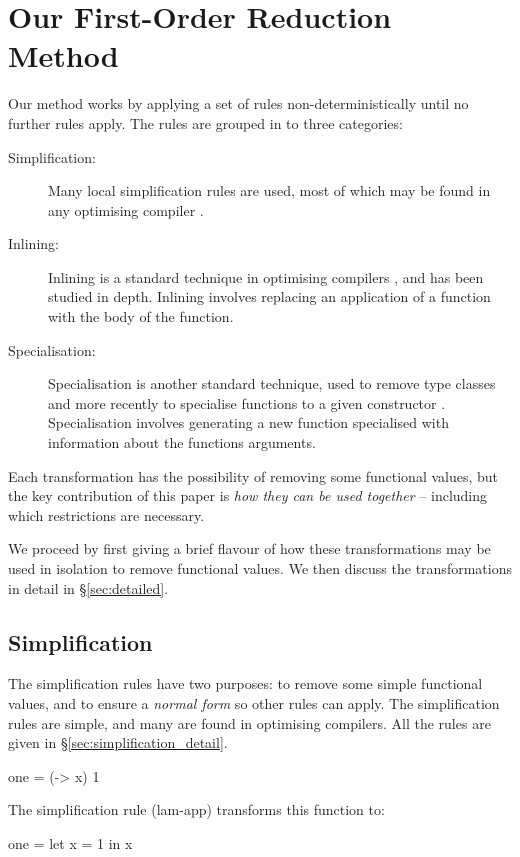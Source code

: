 \documentclass[preprint]{sigplanconf}
\begin{document}
\section{Our First-Order Reduction Method}
\label{sec:overview}

Our method works by applying a set of rules non-deterministically until no further rules apply. The rules are grouped in to three categories:

\begin{description}
\item[Simplification:] Many local simplification rules are used, most of which may be found in any optimising compiler \cite{spj:transformation}.
\item[Inlining:] Inlining is a standard technique in optimising compilers \cite{spj:inlining}, and has been studied in depth. Inlining involves replacing an application of a function with the body of the function.
\item[Specialisation:] Specialisation is another standard technique, used to remove type classes \cite{jones:dictionary_free} and more recently to specialise functions to a given constructor \cite{spj:specconstr}. Specialisation involves generating a new function specialised with information about the functions arguments.
\end{description}

Each transformation has the possibility of removing some functional values, but the key contribution of this paper is \textit{how they can be used together} -- including which restrictions are necessary.

We proceed by first giving a brief flavour of how these transformations may be used in isolation to remove functional values. We then discuss the transformations in detail in \S\ref{sec:detailed}.

\subsection{Simplification}

The simplification rules have two purposes: to remove some simple functional values, and to ensure a \textit{normal form} so other rules can apply. The simplification rules are simple, and many are found in optimising compilers. All the rules are given in \S\ref{sec:simplification_detail}.

\begin{example}
\begin{code}
one = (\x -> x) 1
\end{code}

\noindent The simplification rule (lam-app) transforms this function to:

\begin{code}
one = let x = 1 in x
\end{code}\codeexample
\end{example}\smallskip
\end{document}
